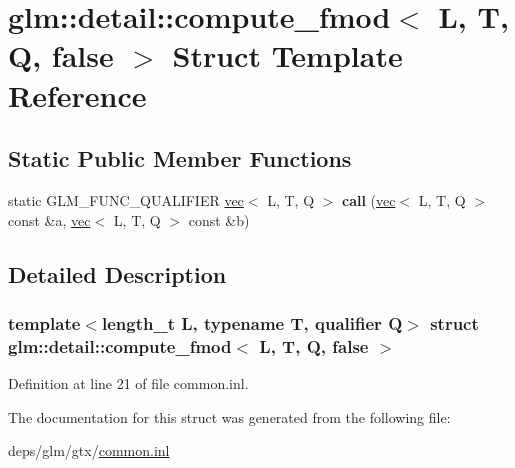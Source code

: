 \hypertarget{structglm_1_1detail_1_1compute__fmod_3_01L_00_01T_00_01Q_00_01false_01_4}{}\section{glm\+:\+:detail\+:\+:compute\+\_\+fmod$<$ L, T, Q, false $>$ Struct Template Reference}
\label{structglm_1_1detail_1_1compute__fmod_3_01L_00_01T_00_01Q_00_01false_01_4}
\subsection*{Static Public Member Functions}
\begin{DoxyCompactItemize}
\item 
\mbox{\label{structglm_1_1detail_1_1compute__fmod_3_01L_00_01T_00_01Q_00_01false_01_4_acaf9308834aca953f992553e0ff0a0e0}} 
static G\+L\+M\+\_\+\+F\+U\+N\+C\+\_\+\+Q\+U\+A\+L\+I\+F\+I\+ER \hyperlink{structglm_1_1vec}{vec}$<$ L, T, Q $>$ {\bfseries call} (\hyperlink{structglm_1_1vec}{vec}$<$ L, T, Q $>$ const \&a, \hyperlink{structglm_1_1vec}{vec}$<$ L, T, Q $>$ const \&b)
\end{DoxyCompactItemize}


\subsection{Detailed Description}
\subsubsection*{template$<$length\+\_\+t L, typename T, qualifier Q$>$\newline
struct glm\+::detail\+::compute\+\_\+fmod$<$ L, T, Q, false $>$}



Definition at line 21 of file common.\+inl.



The documentation for this struct was generated from the following file\+:\begin{DoxyCompactItemize}
\item 
deps/glm/gtx/\hyperlink{common_8inl}{common.\+inl}\end{DoxyCompactItemize}
